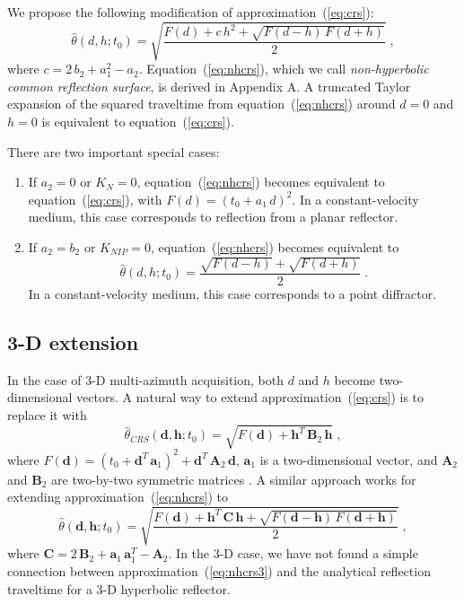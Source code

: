 We propose the following modification of approximation~(\ref{eq:crs}):
\begin{equation}
\widehat{\theta}(d,h;t_0) = \sqrt{\frac{F(d) + c\,h^2
 + \sqrt{F(d-h)\,F(d+h)}}{2}}\;,
\label{eq:nhcrs}
\end{equation}
where $c=2\,b_2+a_1^2-a_2$.  Equation~(\ref{eq:nhcrs}), which we call
\emph{non-hyperbolic common reflection surface}, is derived in
Appendix A. A truncated Taylor expansion of the squared traveltime
from equation~(\ref{eq:nhcrs}) around $d=0$ and $h=0$ is equivalent to
equation~(\ref{eq:crs}).

There are two important special cases:
\begin{enumerate}
\item If $a_2=0$ or $K_N=0$, equation~(\ref{eq:nhcrs}) becomes equivalent to equation~(\ref{eq:crs}), with $F(d) = (t_0 + a_1\,d)^2$. 
In a constant-velocity medium, this case corresponds to reflection from a planar reflector.
\item If $a_2=b_2$ or $K_{NIP}=0$, equation~(\ref{eq:nhcrs}) becomes equivalent to 
\begin{equation}
\widehat{\theta}(d,h;t_0) = \frac{\sqrt{F(d-h)}+\sqrt{F(d+h)}}{2}\;.
\label{eq:dsr}
\end{equation}
In a constant-velocity medium, this case corresponds to a point diffractor.
\end{enumerate}

\subsection{3-D extension}

In the case of 3-D multi-azimuth acquisition, both $d$ and $h$ become
two-dimensional vectors. A natural way to extend
approximation~(\ref{eq:crs}) is to replace it with
\begin{equation}
\label{eq:crs3}
\widehat{\theta}_{CRS}(\mathbf{d},\mathbf{h};t_0) = 
\sqrt{F(\mathbf{d}) + \mathbf{h}^T\,\mathbf{B}_2\,\mathbf{h}}\;,
\end{equation}
where $F(\mathbf{d}) = (t_0 + \mathbf{d}^T\,\mathbf{a}_1)^2 +
\mathbf{d}^T\,\mathbf{A}_2\,\mathbf{d}$, $\mathbf{a}_1$ is a
two-dimensional vector, and $\mathbf{A}_2$ and $\mathbf{B}_2$ are
two-by-two symmetric matrices \cite[]{tygel}. A similar approach 
works for extending approximation~(\ref{eq:nhcrs}) to
\begin{equation}
\widehat{\theta}(\mathbf{d},\mathbf{h};t_0) = 
\sqrt{\frac{F(\mathbf{d}) + \mathbf{h}^T\,\mathbf{C}\,\mathbf{h} + 
\sqrt{F(\mathbf{d}-\mathbf{h})\,F(\mathbf{d}+\mathbf{h})}}{2}}\;,
\label{eq:nhcrs3}
\end{equation}
where
$\mathbf{C}=2\,\mathbf{B}_2+\mathbf{a}_1\,\mathbf{a}_1^T-\mathbf{A}_2$.
In the 3-D case, we have not found a simple connection between
approximation~(\ref{eq:nhcrs3}) and the analytical reflection
traveltime for a 3-D hyperbolic reflector.
 
